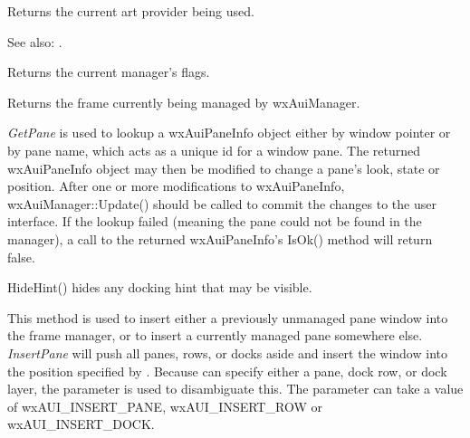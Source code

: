 
Returns the current art provider being used.

See also: .

\label{wxauimanagergetflags}


Returns the current manager's flags.

\label{wxauimanagergetmanagedwindow}


Returns the frame currently being managed by wxAuiManager.

\label{wxauimanagergetpane}



{\it GetPane} is used to lookup a wxAuiPaneInfo object
either by window pointer or by pane name, which acts as a unique id for
a window pane. The returned wxAuiPaneInfo object may then be modified to
change a pane's look, state or position. After one or more
modifications to wxAuiPaneInfo, wxAuiManager::Update() should be called
to commit the changes to the user interface. If the lookup failed
(meaning the pane could not be found in the manager), a call to the
returned wxAuiPaneInfo's IsOk() method will return false.

\label{wxauimanagerhidehint}


HideHint() hides any docking hint that may be visible.

\label{wxauimanagerinsertpane}


This method is used to insert either a previously unmanaged pane window
into the frame manager, or to insert a currently managed pane somewhere 
else. {\it InsertPane} will push all panes, rows, or docks aside and
insert the window into the position specified by . 
Because  can specify either a pane, dock row, or dock
layer, the  parameter is used to disambiguate this. The
parameter  can take a value of wxAUI\_INSERT\_PANE, wxAUI\_INSERT\_ROW 
or wxAUI\_INSERT\_DOCK.


